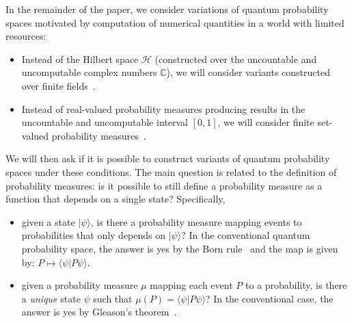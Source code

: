 \documentclass{article}
\theoremstyle{remark}
\newcommand{\Hilb}{\mathcal{H}}
\newcommand{\ket}[1]{|#1\rangle}
\newcommand{\ip}[2]{\langle #1 | #2 \rangle}
\begin{document}
In the remainder of the paper, we consider variations of quantum
probability spaces motivated by computation of numerical quantities in
a world with limited resources:
\begin{itemize}
\item Instead of the Hilbert space $\Hilb$ (constructed over the uncountable
and uncomputable complex numbers $\mathbb{C}$), we will consider
variants constructed over finite fields~\cite{DQT2014,geometry2013}. 
\item Instead of real-valued probability measures producing results in
  the uncountable and uncomputable interval $[0,1]$, we will consider
  finite set-valued probability measures~\cite{PuriRalescu1983}.
\end{itemize}
We will then ask if it is possible to construct variants of quantum
probability spaces under these conditions. The main question is
related to the definition of probability measures: is it possible to
still define a probability measure as a function that depends on a
single state? Specifically,
\begin{itemize}
\item given a state $\ket{\psi}$, is there a probability measure
  mapping events to probabilities that only depends on $\ket{\psi}$?
  In the conventional quantum probability space, the answer is yes by
  the Born rule~\cite{Born1983,Mermin2007} and the map is given by:
  $P \mapsto \ip{\psi}{P\psi}$.
\item given a probability measure $\mu$
  mapping each event $P$
  to a probability, is there a \emph{unique} state $\psi$
  such that $\mu(P)
  =
  \ip{\psi}{P\psi}$? In the conventional case, the answer is yes by
  Gleason's
  theorem~\cite{gleason1957,peres1995quantum,Redhead1987-REDINA}.
\end{itemize}
\end{document}
